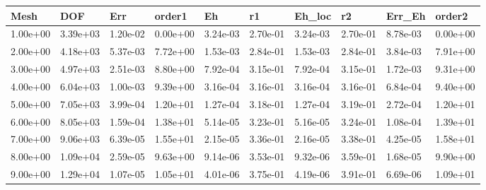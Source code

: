 \begin{tabular}{llllllllll}
Mesh & DOF & Err & order1 & Eh & r1 & Eh_loc & r2 & Err_Eh & order2 \\ 
\hline 
1.00e+00 & 3.39e+03 & 1.20e-02 & 0.00e+00 & 3.24e-03 & 2.70e-01 & 3.24e-03 & 2.70e-01 & 8.78e-03 & 0.00e+00 \\ 
2.00e+00 & 4.18e+03 & 5.37e-03 & 7.72e+00 & 1.53e-03 & 2.84e-01 & 1.53e-03 & 2.84e-01 & 3.84e-03 & 7.91e+00 \\ 
3.00e+00 & 4.97e+03 & 2.51e-03 & 8.80e+00 & 7.92e-04 & 3.15e-01 & 7.92e-04 & 3.15e-01 & 1.72e-03 & 9.31e+00 \\ 
4.00e+00 & 6.04e+03 & 1.00e-03 & 9.39e+00 & 3.16e-04 & 3.16e-01 & 3.16e-04 & 3.16e-01 & 6.84e-04 & 9.40e+00 \\ 
5.00e+00 & 7.05e+03 & 3.99e-04 & 1.20e+01 & 1.27e-04 & 3.18e-01 & 1.27e-04 & 3.19e-01 & 2.72e-04 & 1.20e+01 \\ 
6.00e+00 & 8.05e+03 & 1.59e-04 & 1.38e+01 & 5.14e-05 & 3.23e-01 & 5.16e-05 & 3.24e-01 & 1.08e-04 & 1.39e+01 \\ 
7.00e+00 & 9.06e+03 & 6.39e-05 & 1.55e+01 & 2.15e-05 & 3.36e-01 & 2.16e-05 & 3.38e-01 & 4.25e-05 & 1.58e+01 \\ 
8.00e+00 & 1.09e+04 & 2.59e-05 & 9.63e+00 & 9.14e-06 & 3.53e-01 & 9.32e-06 & 3.59e-01 & 1.68e-05 & 9.90e+00 \\ 
9.00e+00 & 1.29e+04 & 1.07e-05 & 1.05e+01 & 4.01e-06 & 3.75e-01 & 4.19e-06 & 3.91e-01 & 6.69e-06 & 1.09e+01 \\ 
\hline 
\end{tabular}